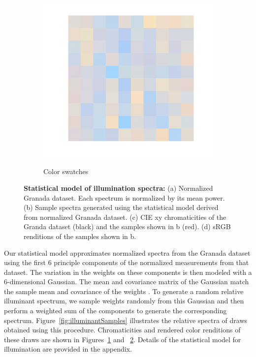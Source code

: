 \documentclass{jov}
\begin{document}
\begin{figure}
\begin{subfigure}[b]{0.24 \textwidth}
        \label{fig:xyDiagram}
        \end{subfigure}
      	\begin{subfigure}[b]{0.24 \textwidth}
    \centering
        \caption{Color swatches}
        \includegraphics[width=\textwidth]{../FiguresDraft5/Figure6/Figure6_d.pdf}
        \label{fig:sRGBIlluminant}
    \end{subfigure}
    \caption{{\bf Statistical model of illumination spectra:} (a) Normalized Granada dataset. Each spectrum is normalized by its mean power. (b) Sample spectra generated using the statistical model derived from normalized Granada dataset. (c) CIE xy chromaticities of the Granda dataset (black) and the samples shown in b (red). (d) sRGB renditions of the samples shown in b.}
\label{fig:illuminant}
\end{figure}

Our statistical model approximates normalized spectra from the Granada dataset using the first 6 principle components of the normalized measurements from that dataset.
The variation in the weights on these components is then modeled with a 6-dimensional Gaussian.
The mean and covariance matrix of the Gaussian match the sample mean and covariance of the weights \cite{BrainardFreeman}. 
To generate a random relative illuminant spectrum, we sample weights randomly from this Gaussian and then perform a weighted sum of the components to generate the corresponding spectrum.
Figure~\ref{fig:illuminantSamples} illustrates the relative spectra of draws obtained using this procedure.
Chromaticities and rendered color renditions of these draws are shown in Figures~\ref{fig:xyDiagram} and ~\ref{fig:sRGBIlluminant}.
Details of the statistical model for illumination are provided in the appendix.
\end{document}
